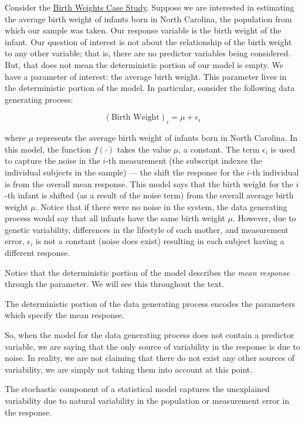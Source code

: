 \documentclass[
]{book}
\theoremstyle{plain}
\theoremstyle{mydefn}
\theoremstyle{myexmpl}
\theoremstyle{remark}
\begin{document}
Consider the \protect\hyperlink{CaseBabies}{Birth Weights Case Study}. Suppose we are interested in estimating the average birth weight of infants born in North Carolina, the population from which our sample was taken. Our response variable is the birth weight of the infant. Our question of interest is not about the relationship of the birth weight to any other variable; that is, there are no predictor variables being considered. But, that does not mean the deterministic portion of our model is empty. We have a parameter of interest: the average birth weight. This parameter lives in the deterministic portion of the model. In particular, consider the following data generating process:

\[(\text{Birth Weight})_i = \mu + \epsilon_i\]

where \(\mu\) represents the average birth weight of infants born in North Carolina. In this model, the function \(f(\cdot)\) takes the value \(\mu\), a constant. The term \(\epsilon_i\) is used to capture the noise in the \(i\)-th measurement (the subscript indexes the individual subjects in the sample) --- the shift the response for the \(i\)-th individual is from the overall mean response. This model says that the birth weight for the \(i\)-th infant is shifted (as a result of the noise term) from the overall average birth weight \(\mu\). Notice that if there were no noise in the system, the data generating process would say that all infants have the same birth weight \(\mu\). However, due to genetic variability, differences in the lifestyle of each mother, and measurement error, \(\epsilon_i\) is not a constant (noise does exist) resulting in each subject having a different response.

Notice that the deterministic portion of the model describes the \emph{mean response} through the parameter. We will see this throughout the text.

\begin{rmdtip}
The deterministic portion of the data generating process encodes the parameters which specify the mean response.
\end{rmdtip}

So, when the model for the data generating process does not contain a predictor variable, we are saying that the only source of variability in the response is due to noise. In reality, we are not claiming that there do not exist any other sources of variability, we are simply not taking them into account at this point.

\begin{rmdkeyidea}
The stochastic component of a statistical model captures the unexplained variability due to natural variability in the population or measurement error in the response.
\end{rmdkeyidea}
\end{document}

